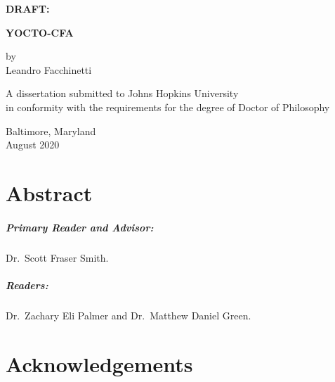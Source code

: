\documentclass[12pt, oneside]{book}
\begin{document}
\frontmatter

\begin{center}
\begin{singlespace}
\vspace*{0.5in}

\textbf{\uppercase{DRAFT: \DTMnow}} %

\textbf{\uppercase{Yocto-CFA}}

\vspace*{1in}

by\\Leandro Facchinetti

\vspace*{1.5in}

A dissertation submitted to Johns Hopkins University\\in conformity with the requirements for the degree of Doctor of Philosophy

\vspace*{0.5in}

Baltimore, Maryland\\August 2020
\end{singlespace}
\end{center}

\thispagestyle{empty}
\clearpage

\chapter{Abstract}


\paragraph{Primary Reader and Advisor:}

Dr.~Scott Fraser Smith.

\paragraph{Readers:}

Dr.~Zachary Eli Palmer and Dr.~Matthew Daniel Green.

\chapter{Acknowledgements}


\tableofcontents
\listoftables
\listoffigures

\mainmatter
\end{document}
